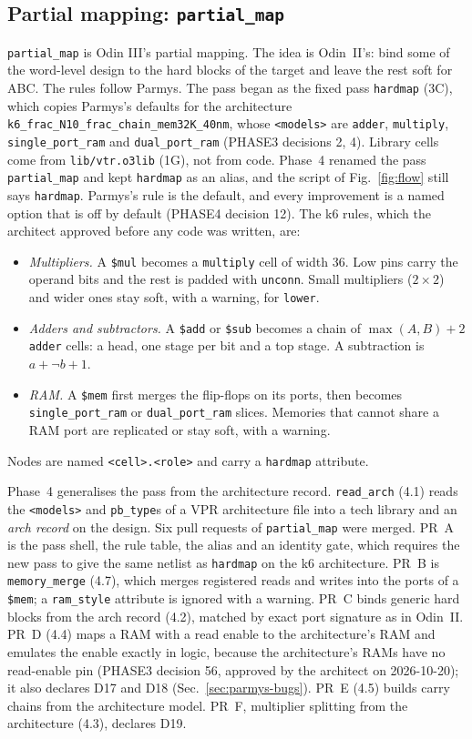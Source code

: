 \documentclass[conference]{IEEEtran}
\newcommand{\code}[1]{\texttt{#1}}
\begin{document}
\subsection{Partial mapping: \code{partial\_map}}
\label{sec:hardmap}

\code{partial\_map} is Odin III's partial mapping. The idea is Odin~II's: bind some of the
word-level design to the hard blocks of the target and leave the rest soft for ABC. The rules
follow Parmys. The pass began as the fixed pass \code{hardmap} (3C), which copies Parmys's defaults for the architecture
\code{k6\_frac\_N10\_frac\_chain\_mem32K\_40nm}, whose \code{<models>} are \code{adder},
\code{multiply}, \code{single\_port\_ram} and \code{dual\_port\_ram} (PHASE3 decisions 2, 4).
Library cells come from \code{lib/vtr.o3lib} (1G), not from code. Phase~4 renamed the pass \code{partial\_map} and kept \code{hardmap} as an alias, and the
script of Fig.~\ref{fig:flow} still says \code{hardmap}. Parmys's rule is the default, and every
improvement is a named option that is off by default (PHASE4 decision 12). The k6 rules, which the
architect approved before any code was written, are:
\begin{itemize}
\item \emph{Multipliers.} A \code{\$mul} becomes a \code{multiply} cell of width 36. Low pins
  carry the operand bits and the rest is padded with \code{unconn}. Small multipliers
  ($2\times2$) and wider ones stay soft, with a warning, for \code{lower}.
\item \emph{Adders and subtractors.} A \code{\$add} or \code{\$sub} becomes a chain of
  $\max(A,B)+2$ \code{adder} cells: a head, one stage per bit and a top stage. A subtraction is
  $a+\lnot b+1$.
\item \emph{RAM.} A \code{\$mem} first merges the flip-flops on its ports, then becomes
  \code{single\_port\_ram} or \code{dual\_port\_ram} slices. Memories that cannot share a RAM
  port are replicated or stay soft, with a warning.
\end{itemize}
Nodes are named \code{<cell>.<role>} and carry a \code{hardmap} attribute.

Phase~4 generalises the pass from the architecture record. \code{read\_arch} (4.1) reads the
\code{<models>} and \code{pb\_type}s of a VPR architecture file into a tech library and an
\emph{arch record} on the design. Six pull requests of \code{partial\_map} were merged. PR~A
is the pass shell, the rule table, the alias and an identity gate, which requires the new pass
to give the same netlist as \code{hardmap} on the k6 architecture. PR~B is \code{memory\_merge}
(4.7), which merges registered reads and writes into the ports of a \code{\$mem}; a
\code{ram\_style} attribute is ignored with a warning. PR~C binds generic hard blocks from the
arch record (4.2), matched by exact port signature as in Odin~II. PR~D (4.4) maps a RAM with a
read enable to the architecture's RAM and emulates the enable exactly in logic, because the
architecture's RAMs have no read-enable pin (PHASE3 decision 56, approved by the architect on
2026-10-20); it also declares D17 and D18 (Sec.~\ref{sec:parmys-bugs}). PR~E (4.5) builds carry
chains from the architecture model. PR~F, multiplier splitting from the architecture (4.3), declares D19.
\end{document}
